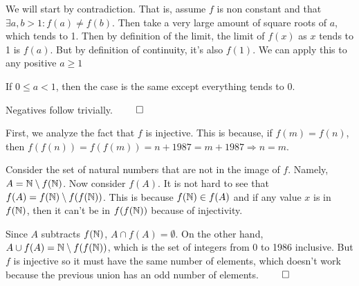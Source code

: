 \documentclass{report}
\begin{document}
\sol We will start by contradiction. That is, assume $f$ is non constant and that $\exists a, b > 1: f(a) \neq f(b)$. Then take a very large amount of square roots of $a$, which tends to 1. Then by definition of the limit, the limit of $f(x)$ as $x$ tends to 1 is $f(a)$. But by definition of continuity, it's also $f(1)$. We can apply this to any positive $a \geq 1$ 

If $0 \leq a < 1$, then the case is the same except everything tends to 0.

Negatives follow trivially. $\qed$


\sol First, we analyze the fact that $f$ is injective. This is because, if $f(m) = f(n)$, then $f(f(n)) = f(f(m)) = n + 1987 = m + 1987 \Longrightarrow n = m$. 

Consider the set of natural numbers that are not in the image of $f$. Namely, $A = \NN \setminus f(\NN)$. Now consider $f(A)$. It is not hard to see that $f(A) = f(\NN) \setminus f(f(\NN))$. This is because $f(\NN) \in f(A)$ and if any value $x$ is in $f(\NN)$, then it can't be in $f(f(\NN))$ because of injectivity.

Since $A$ subtracts $f(\NN)$, $A \cap f(A) = \emptyset$. On the other hand, $A \cup f(A) = \NN \setminus f(f(\NN))$, which is the set of integers from 0 to 1986 inclusive. But $f$ is injective so it must have the same number of elements, which doesn't work because the previous union has an odd number of elements. $\qed$
\end{document}
